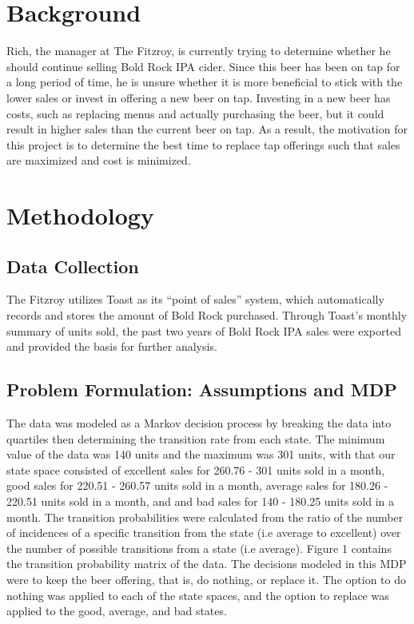 \documentclass[conference]{IEEEtran}
\begin{document}
\section{Background}
Rich, the manager at The Fitzroy, is currently trying to determine whether he should continue selling Bold Rock IPA cider. Since this beer has been on tap for a long period of time, he is unsure whether it is more beneficial to stick with the lower sales or invest in offering a new beer on tap. Investing in a new beer has costs, such as replacing menus and actually purchasing the beer, but it could result in higher sales than the current beer on tap. As a result, the motivation for this project is to determine the best time to replace tap offerings such that sales are maximized and cost is minimized.

\section{Methodology}

\subsection{Data Collection}\label{AA}
The Fitzroy utilizes Toast as its ``point of sales'' system, which automatically records and stores the amount of Bold Rock purchased. Through Toast's monthly summary of units sold, the past two years of Bold Rock IPA sales were exported and provided the basis for further analysis. 

\subsection{Problem Formulation: Assumptions and MDP}
The data was modeled as a Markov decision process by breaking the data into quartiles then determining the transition rate from each state.  The minimum value of the data was 140 units and the maximum was 301 units, with that our state space consisted of excellent sales for 260.76 - 301 units sold in a month, good sales for 220.51 - 260.57 units sold in a month, average sales for 180.26 - 220.51 units sold in a month, and and bad sales for 140 - 180.25 units sold in a month.  The transition probabilities were calculated from the ratio of the number of incidences of a specific transition from the state (i.e average to excellent) over the number of possible transitions from a state (i.e average).  Figure 1 contains the transition probability matrix of the data. The decisions modeled in this MDP were to keep the beer offering, that is, do nothing, or replace it.  The option to do nothing was applied to each of the state spaces, and the option to replace was applied to the good, average, and bad states.  
\end{document}
